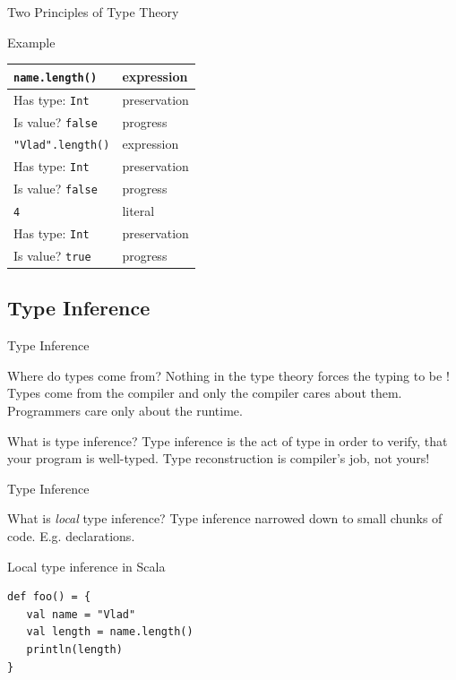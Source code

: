 \begin{frame}[fragile]{Two Principles of Type Theory}
\begin{exampleblock}{Example}
\begin{center}
\begin{tabular}{l|l}
\hline
\lstinline!name.length()! & expression\\
\hline
Has type: \lstinline!Int! & preservation\\
Is value? \lstinline!false! & progress\\
\hline
\hline
\pause
\lstinline!"Vlad".length()! & expression\\
\hline
Has type: \lstinline!Int! & preservation\\
Is value? \lstinline!false! & progress\\
\hline
\hline
\pause
\lstinline!4! & literal\\
\hline
Has type: \lstinline!Int! & preservation\\
Is value? \lstinline!true! &  progress\\
\hline
\end{tabular}
\end{center}
\end{exampleblock}
\end{frame}

\subsection{Type Inference}
\begin{frame}{Type Inference}
\begin{block}{Where do types come from?}
\alert{Nothing} in the type theory forces the typing to be
! Types come from the compiler and only the compiler cares
about them. Programmers care only about the runtime.
\end{block}
\pause
\begin{block}{What is type inference?}
Type inference is the act of type  in order to
verify, that your program is well-typed. Type reconstruction is compiler's job,
\alert{not} yours!
\end{block}
\end{frame}

\begin{frame}[fragile]{Type Inference}
\begin{block}{What is \emph{local} type inference?}
Type inference narrowed down to small chunks of code. E.g. declarations.
\end{block}
\pause
\begin{exampleblock}{Local type inference in Scala}
\begin{lstlisting}
def foo() = {
   val name = "Vlad"
   val length = name.length()
   println(length)
}
\end{lstlisting}
\end{exampleblock}
\end{frame}

